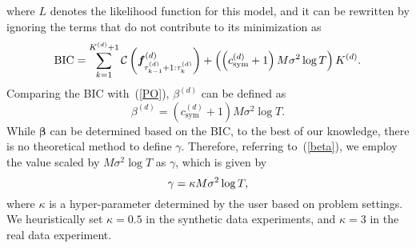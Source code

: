 where $L$ denotes the likelihood function for this model, %
and it can be rewritten by ignoring the terms that do not contribute to its minimization as 
\begin{equation}
  \text{BIC} = \sum_{k=1}^{{K}^{(d)}+1} \mathcal{C} \left(\bm{f}_{\tau_{k - 1}^{(d)}+1 : \tau_k^{(d)}}^{(d)}\right) +  \left(\left(c_{\text{sym}}^{(d)}+1\right) M \sigma^2 \log T\right) K^{(d)}. \notag
\end{equation}
Comparing the BIC with~(\ref{PO}), $\beta^{(d)}$ can be defined as
\begin{equation}
  \beta^{(d)} = \left(c_{\text{sym}}^{(d)}+1\right) M \sigma^2 \log T. \label{beta}
\end{equation}
While $\bm{\beta}$ can be determined based on the BIC, 
to the best of our knowledge, 
there is no theoretical method to define $\gamma$.  
Therefore, referring to~(\ref{beta}), 
we employ the value scaled by $M \sigma^2 \log T$ as $\gamma$, 
which is given by
\begin{equation}
  \gamma = \kappa M \sigma^2 \log T, \notag
\end{equation}
where $\kappa$ is a hyper-parameter determined by the user based on problem settings. 
We heuristically set $\kappa = 0.5$ in the synthetic data experiments, 
and $\kappa = 3$ in the real data experiment.